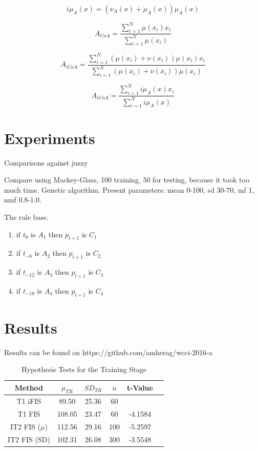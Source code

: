 \documentclass[conference]{IEEEtran}
\begin{document}
\begin{equation}
  i\mu_{A}(x) = (\nu_{A}(x) + \mu_{A}(x))\mu_{A}(x)
\end{equation}

\begin{equation}
  A_{CoA} = \dfrac{\sum_{i=1}^{N} \mu(x_{i})
    x_{i}}{\sum_{i=1}^{N} \mu(x_{i})}
\end{equation}

\begin{equation}
  A_{iCoA} = \dfrac{\sum_{i=1}^{N} (\mu(x_{i}) + \nu(x_{i})) \mu(x_{i})
    x_{i}}{\sum_{i=1}^{N} (\mu(x_{i}) + \nu(x_{i})) \mu(x_{i})}
\end{equation}

\begin{equation}
  A_{iCoA} = \dfrac{\sum_{i=1}^{N} i\mu_{A}(x) x_{i}}{\sum_{i=1}^{N}
    i\mu_{A}(x)}
\end{equation}

\section{Experiments}

Comparisons against juzzy \cite{wagner2013juzzy}

Compare using Mackey-Glass, 100 training, 50 for testing, because it
took too much time. Genetic algorithm. Present parameters: mean 0-100,
sd 30-70, mf 1, nmf 0.8-1.0.

The rule base.

\begin{enumerate}
  \item if $t_{0}$ is $A_{1}$ then $p_{t+1}$ is $C_{1}$
  \item if $t_{-6}$ is $A_{2}$ then $p_{t+1}$ is $C_{2}$
  \item if $t_{-12}$ is $A_{3}$ then $p_{t+1}$ is $C_{3}$
  \item if $t_{-18}$ is $A_{4}$ then $p_{t+1}$ is $C_{4}$
\end{enumerate}

\section{Results}

Results can be found on https://github.com/amherag/wcci-2016-a

\begin{table}[!t]
  \renewcommand{\arraystretch}{1.3}
  \caption{Hypothesis Tests for the Training Stage}
  \label{hypothesis-tests-training}
  \centering
  \begin{tabular}{|c|c|c|c|c|c|}
    \hline
    Method & $\mu_{TR}$ & $SD_{TR}$ & $n$ & t-Value\\
    \hline
    T1 iFIS & 89.50 & 25.36 & 60 & \\
    \hline
    T1 FIS & 108.05 & 23.47 & 60 & -4.1584 \\
    \hline
    IT2 FIS (\(\mu\)) & 112.56 & 29.16 & 100 & -5.2597 \\
    \hline
    IT2 FIS (SD) & 102.31 & 26.08 & 300 & -3.5548 \\
    \hline
  \end{tabular}
\end{table}
\end{document}
